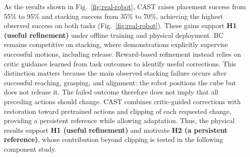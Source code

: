

As the results shown in Fig.~\ref{fig:real-robot}, CAST raises placement success from 55\% to 95\% and stacking success from 35\% to 70\%, achieving the highest observed success on both tasks (Fig.~\ref{fig:real-robot}). 
These gains support \textbf{H1 (useful refinement)} under offline training and physical deployment. 
BC remains competitive on stacking, where demonstrations explicitly supervise successful motions, including release. 
Reward-based refinement instead relies on critic guidance learned from task outcomes to identify useful corrections. 
This distinction matters because the main observed stacking failure occurs after successful reaching, grasping, and alignment: the robot positions the cube but does not release it. 
The failed outcome therefore does not imply that all preceding actions should change. 
CAST combines critic-guided corrections with restoration toward pretrained actions and clipping of each requested change, providing a persistent reference while allowing adaptation. Thus, the physical results support \textbf{H1 (useful refinement)} and motivate \textbf{H2 (a persistent reference)}, whose contribution beyond clipping is tested in the following component study.